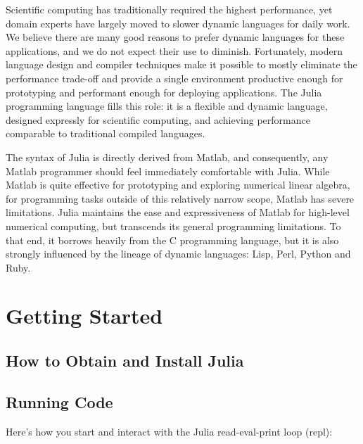 \documentclass{article}
\title{\thetitle}
\author{
Jeff Bezanson \vspace{0.5em}\\
Stefan Karpinski \vspace{0.5em}\\
Viral Shah \vspace{0.5em}
}
\renewcommand{\sec}[1]{\label{sec:#1}}
\begin{document}
\maketitle

Scientific computing has traditionally required the highest performance, yet domain experts have largely moved to slower dynamic languages for daily work.
We believe there are many good reasons to prefer dynamic languages for these applications, and we do not expect their use to diminish.
Fortunately, modern language design and compiler techniques make it possible to mostly eliminate the performance trade-off and provide a single environment productive enough for prototyping and performant enough for deploying applications.
The Julia programming language fills this role:
it is a flexible and dynamic language, designed expressly for scientific computing, and achieving performance comparable to traditional compiled languages.

The syntax of Julia is directly derived from Matlab, and consequently, any Matlab programmer should feel immediately comfortable with Julia.
While Matlab is quite effective for prototyping and exploring numerical linear algebra, for programming tasks outside of this relatively narrow scope, Matlab has severe limitations.
Julia maintains the ease and expressiveness of Matlab for high-level numerical computing, but transcends its general programming limitations.
To that end, it borrows heavily from the C programming language, but it is also strongly influenced by the lineage of dynamic languages:
Lisp, Perl, Python and Ruby.

\section{Getting Started}
\sec{getting-started}

\subsection{How to Obtain and Install Julia}
\sec{obtaining-and-installing}

\subsection{Running Code}
\sec{running-code}

Here's how you start and interact with the Julia read-eval-print loop (repl):
\end{document}
